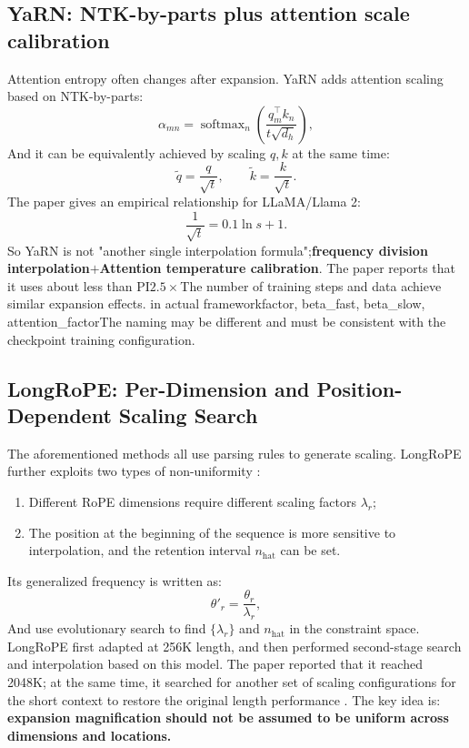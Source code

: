 \documentclass[UTF8,fontset=none,a4paper,10pt]{ctexart}
\newcommand{\term}[1]{\textbf{#1}}
\newcommand{\softmax}{\operatorname{softmax}}
\begin{document}
\subsection{YaRN: NTK-by-parts plus attention scale calibration}

Attention entropy often changes after expansion. YaRN adds attention scaling\cite{peng2024yarn} based on NTK-by-parts:
\begin{equation}
  \alpha_{mn}=\softmax_n\!\left(
  \frac{q_m^\top k_n}{t\sqrt{d_h}}
  \right),
  \label{eq:yarn-temperature}
\end{equation}
And it can be equivalently achieved by scaling $q,k$ at the same time:
\begin{equation}
  \tilde q=\frac{q}{\sqrt{t}},\qquad
  \tilde k=\frac{k}{\sqrt{t}}.
  \label{eq:yarn-qk-scale}
\end{equation}
The paper gives an empirical relationship for LLaMA/Llama 2:
\begin{equation}
  \frac{1}{\sqrt{t}}=0.1\ln s+1.
  \label{eq:yarn-fit}
\end{equation}
So YaRN is not "another single interpolation formula";\term{frequency division interpolation$+$Attention temperature calibration}. The paper reports that it uses about less than PI$2.5\times$The number of training steps and data achieve similar expansion effects\cite{peng2024yarn}. in actual framework\textnormal{factor}, \textnormal{beta\_fast}, \textnormal{beta\_slow}, \textnormal{attention\_factor}The naming may be different and must be consistent with the checkpoint training configuration.

\subsection{LongRoPE: Per-Dimension and Position-Dependent Scaling Search}

The aforementioned methods all use parsing rules to generate scaling. LongRoPE further exploits two types of non-uniformity \cite{ding2024longrope}:
\begin{enumerate}
\item Different RoPE dimensions require different scaling factors $\lambda_r$;
\item The position at the beginning of the sequence is more sensitive to interpolation, and the retention interval $n_{\mathrm{hat}}$ can be set.
\end{enumerate}
Its generalized frequency is written as:
\begin{equation}
  \theta'_r=\frac{\theta_r}{\lambda_r},
  \label{eq:longrope-scale}
\end{equation}
And use evolutionary search to find $\{\lambda_r\}$ and $n_{\mathrm{hat}}$ in the constraint space. LongRoPE first adapted at 256K length, and then performed second-stage search and interpolation based on this model. The paper reported that it reached 2048K; at the same time, it searched for another set of scaling configurations for the short context to restore the original length performance \cite{ding2024longrope}. The key idea is: \term{ expansion magnification should not be assumed to be uniform across dimensions and locations. }
\end{document}
